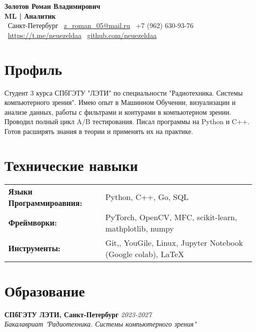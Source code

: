 \documentclass[a4paper,10pt]{article}
\begin{document}
\begin{center}
    {\LARGE \textbf{Золотов Роман Владимирович}}\\
    \vspace{2mm}
    \normalsize \textbf {ML | Аналитик}\\
    \vspace{2mm}
    \faMapMarker*\ Санкт-Петербург\quad
    \faEnvelope\ \href{mailto:z_roman_05@mail.ru}{z\_roman\_05@mail.ru} \quad
    \faPhone\ +7 (962) 630-93-76 \quad\\
    \vspace{2mm}
    \faTelegramPlane\ \href{https://t.me/neuezeldaa}{https://t.me/neuezeldaa} \quad
    \faGithub\ \href{https://github.com/neuezeldaa}{github.com/neuezeldaa} \\
\end{center}

\section*{\faMale \hspace{0.5em} Профиль}
Студент 3 курса СПбГЭТУ "ЛЭТИ" по специальности "Радиотехника. Системы компьютерного зрения". Имею опыт в Машинном Обучении, визуализации и анализе данных, работы с фильтрами и контурами в компьютерном зрении.
Проводил полный цикл A/B тестирования. Писал программы на Python и C++. Готов расширять знания в теории и применять их на практике.

\section*{\faWrench \hspace{0.5em} Технические навыки}
\begin{tabular}{ l l }
    \textbf{Языки Программироавния:} & Python, C++, Go, SQL \\
    \textbf{Фреймворки:} & PyTorch, OpenCV, MFC, scikit-learn, mathplotlib, numpy \\
    \textbf{Инструменты:} & Git,, YouGile, Linux, Jupyter Notebook (Google colab), LaTeX\\
\end{tabular}


\section*{\faUniversity \hspace{0.5em} Образование}
\textbf{СПбГЭТУ ЛЭТИ, Санкт-Петербург} \hfill \textit{ 2023-2027} \\
\textit{Бакалавриат "Радиотехника. Системы компьютерного зрения"} \\
\end{document}
